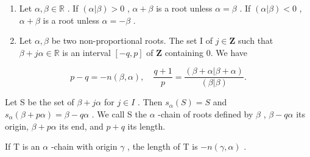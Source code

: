 \begin{enumerate}
\def\labelenumi{\arabic{enumi})}
\setcounter{enumi}{6}
\item
  Let \(\alpha, \beta \in \mathbb{R}\) . If \((\alpha|\beta) > 0\) , \(\alpha + \beta\) is a root unless \(\alpha = \beta\) . If \((\alpha|\beta) < 0\) , \(\alpha + \beta\) is a root unless \(\alpha = -\beta\) .
\item
  Let \(\alpha, \beta\) be two non-proportional roots. The set I of \(j \in \mathbf{Z}\) such that \(\beta + j\alpha \in \mathbb{R}\) is an interval \([-q, p]\) of \(\mathbf{Z}\) containing 0. We have
\end{enumerate}

\[
p - q = - n (\beta , \alpha), \quad \frac {q + 1}{p} = \frac {(\beta + \alpha | \beta + \alpha)}{(\beta | \beta)}.
\]

Let S be the set of \(\beta + j\alpha\) for \(j \in I\) . Then \(s_{\alpha}(S) = S\) and \(s_{\alpha}(\beta + p\alpha) = \beta - q\alpha\) . We call S the \(\alpha\) -chain of roots defined by \(\beta\) , \(\beta - q\alpha\) its origin, \(\beta + p\alpha\) its end, and \(p + q\) its length.

If T is an \(\alpha\) -chain with origin \(\gamma\) , the length of T is \(-n(\gamma, \alpha)\) .

